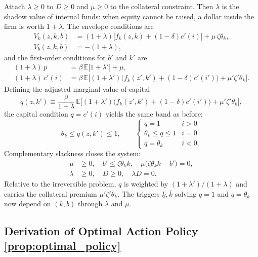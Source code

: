 Attach $\lambda \ge 0$ to $D \ge 0$ and $\mu \ge 0$ to the collateral
constraint. Then $\lambda$ is the shadow value of internal funds: when equity
cannot be raised, a dollar inside the firm is worth $1+\lambda$. The envelope
conditions are
\begin{align}
    V_k(z,k,b) &= (1+\lambda)\big[f_k(z,k) + (1-\delta)c'(i)\big] + \mu\,\zeta\theta_k, \\
    V_b(z,k,b) &= -(1+\lambda),
\end{align}
and the first-order conditions for $b'$ and $k'$ are
\begin{align}
    (1+\lambda)\,p &= \beta\,\mathbb{E}\big[1+\lambda'\big] + \mu, \\
    (1+\lambda)\,c'(i) &= \beta\,\mathbb{E}\big[(1+\lambda')\big(f_k(z',k') + (1-\delta)c'(i')\big) + \mu'\zeta'\theta_k\big].
\end{align}
Defining the adjusted marginal value of capital
\begin{equation}
    q(z,k') \equiv \frac{\beta}{1+\lambda}\,
        \mathbb{E}\big[(1+\lambda')\big(f_k(z',k') + (1-\delta)c'(i')\big) + \mu'\zeta'\theta_k\big],
\end{equation}
the capital condition $q = c'(i)$ yields the same band as before:
\begin{equation}
    \theta_k \le q(z,k') \le 1, \qquad
    \begin{cases}
        q = 1 & i > 0 \\
        \theta_k \le q \le 1 & i = 0 \\
        q = \theta_k & i < 0 .
    \end{cases}
\end{equation}
Complementary slackness closes the system:
\begin{align}
    \mu &\ge 0, \quad b' \le \zeta\theta_k k, \quad \mu\big(\zeta\theta_k k - b'\big) = 0, \\
    \lambda &\ge 0, \quad D \ge 0, \quad \lambda D = 0 .
\end{align}
Relative to the irreversible problem, $q$ is weighted by
$(1+\lambda')/(1+\lambda)$ and carries the collateral premium $\mu'\zeta'\theta_k$.
The triggers $\underline{k}, \overline{k}$ solving $q = 1$ and $q = \theta_k$ now
depend on $(k,b)$ through $\lambda$ and $\mu$.


\subsection{Derivation of Optimal Action Policy \ref{prop:optimal_policy}}

